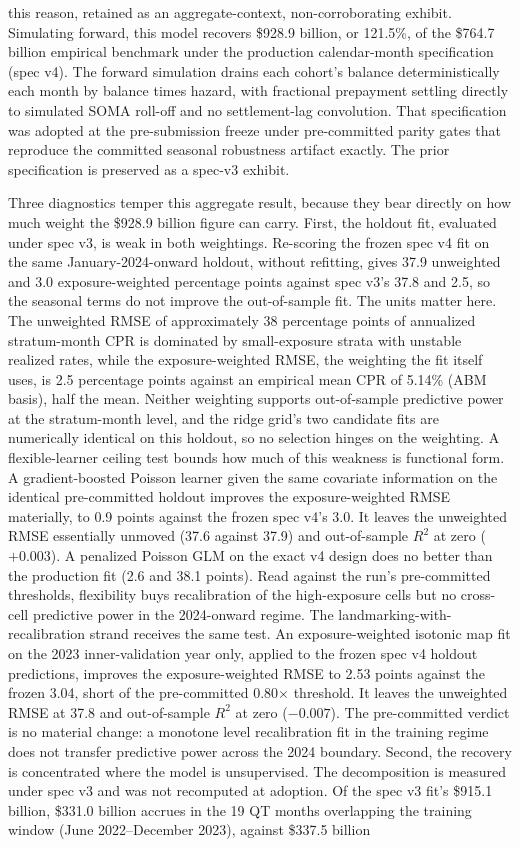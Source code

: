 \documentclass[12pt]{article}
\begin{document}
this reason, retained as an aggregate-context, non-corroborating exhibit. Simulating forward, this model recovers \$928.9 billion, or 121.5\%, of the \$764.7 billion empirical benchmark under the production calendar-month specification (spec v4). The forward simulation drains each cohort's balance deterministically each month by balance times hazard, with fractional prepayment settling directly to simulated SOMA roll-off and no settlement-lag convolution. That specification was adopted at the pre-submission freeze under pre-committed parity gates that reproduce the committed seasonal robustness artifact exactly. The prior specification is preserved as a spec-v3 exhibit.

Three diagnostics temper this aggregate result, because they bear directly on how much weight the \$928.9 billion figure can carry. First, the holdout fit, evaluated under spec v3, is weak in both weightings. Re-scoring the frozen spec v4 fit on the same January-2024-onward holdout, without refitting, gives 37.9 unweighted and 3.0 exposure-weighted percentage points against spec v3's 37.8 and 2.5, so the seasonal terms do not improve the out-of-sample fit. The units matter here. The unweighted RMSE of approximately 38 percentage points of annualized stratum-month CPR is dominated by small-exposure strata with unstable realized rates, while the exposure-weighted RMSE, the weighting the fit itself uses, is 2.5 percentage points against an empirical mean CPR of 5.14\% (ABM basis), half the mean. Neither weighting supports out-of-sample predictive power at the stratum-month level, and the ridge grid's two candidate fits are numerically identical on this holdout, so no selection hinges on the weighting. A flexible-learner ceiling test bounds how much of this weakness is functional form. A gradient-boosted Poisson learner given the same covariate information on the identical pre-committed holdout improves the exposure-weighted RMSE materially, to 0.9 points against the frozen spec v4's 3.0. It leaves the unweighted RMSE essentially unmoved (37.6 against 37.9) and out-of-sample $R^2$ at zero ($+0.003$). A penalized Poisson GLM on the exact v4 design does no better than the production fit (2.6 and 38.1 points). Read against the run's pre-committed thresholds, flexibility buys recalibration of the high-exposure cells but no cross-cell predictive power in the 2024-onward regime. The landmarking-with-recalibration strand receives the same test. An exposure-weighted isotonic map fit on the 2023 inner-validation year only, applied to the frozen spec v4 holdout predictions, improves the exposure-weighted RMSE to 2.53 points against the frozen 3.04, short of the pre-committed 0.80$\times$ threshold. It leaves the unweighted RMSE at 37.8 and out-of-sample $R^2$ at zero ($-0.007$). The pre-committed verdict is no material change: a monotone level recalibration fit in the training regime does not transfer predictive power across the 2024 boundary. Second, the recovery is concentrated where the model is unsupervised. The decomposition is measured under spec v3 and was not recomputed at adoption. Of the spec v3 fit's \$915.1 billion, \$331.0 billion accrues in the 19 QT months overlapping the training window (June 2022--December 2023), against \$337.5 billion 
\end{document}
